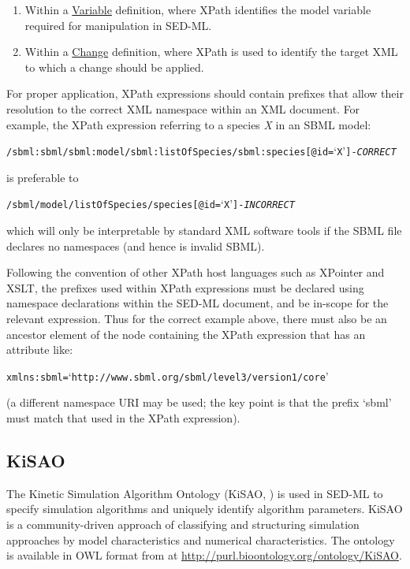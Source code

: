 \begin{enumerate}
\item {Within a \hyperref[class:variable]{Variable} definition, where XPath identifies the model variable required for manipulation in SED-ML.}
\item {Within a  \hyperref[class:change]{Change} definition, where XPath is used to identify the target XML to which a change should be applied.} 

\end{enumerate}

For proper application, XPath expressions should contain prefixes that allow their resolution to the correct XML namespace within an XML document. For example, the XPath expression referring to a species \emph{X} in an SBML model:
\begin{alltt}
/sbml:sbml/sbml:model/sbml:listOfSpecies/sbml:species[@id=`X'] {\color{green} \tickYes -\emph{CORRECT}}
\end{alltt}
is preferable to 
\begin{alltt}
/sbml/model/listOfSpecies/species[@id=`X'] {\color{red} \tickNo -\emph{INCORRECT} }
\end{alltt}

which will only be interpretable by standard XML software tools if the SBML file declares no namespaces (and hence is invalid SBML).

Following the convention of other XPath host languages such as XPointer and XSLT, the prefixes used within XPath expressions must be declared using namespace declarations within the SED-ML document, and be in-scope for the relevant expression.
Thus for the correct example above, there must also be an ancestor element of the node containing the XPath expression that has an attribute like:
\begin{alltt}
xmlns:sbml=`http://www.sbml.org/sbml/level3/version1/core'
\end{alltt}
(a different namespace URI may be used; the key point is that the prefix `sbml' must match that used in the XPath expression).

\subsection{KiSAO}
\label{sec:kisao}

The Kinetic Simulation Algorithm Ontology (KiSAO, \citep{CWK+10}) is 
used in SED-ML to specify simulation algorithms and uniquely identify 
algorithm parameters. KiSAO is a community-driven approach of 
classifying and structuring simulation approaches by model 
characteristics and numerical characteristics. The ontology is available 
in OWL format from  at 
\url{http://purl.bioontology.org/ontology/KiSAO}. 

